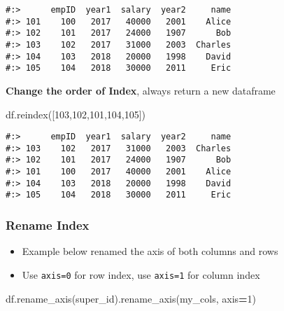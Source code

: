 \documentclass[
]{book}
\newenvironment{Shaded}{\begin{snugshade}}{\end{snugshade}}
\newcommand{\DecValTok}[1]{\textcolor[rgb]{0.06,0.06,0.06}{#1}}
\newcommand{\NormalTok}[1]{#1}
\newcommand{\OperatorTok}[1]{\textcolor[rgb]{0.43,0.43,0.43}{\textbf{#1}}}
\newcommand{\StringTok}[1]{\textcolor[rgb]{0.5,0.5,0.5}{#1}}
\providecommand{\tightlist}{%
  \setlength{\itemsep}{0pt}\setlength{\parskip}{0pt}}
\begin{document}
\begin{verbatim}
#:>      empID  year1  salary  year2     name
#:> 101    100   2017   40000   2001    Alice
#:> 102    101   2017   24000   1907      Bob
#:> 103    102   2017   31000   2003  Charles
#:> 104    103   2018   20000   1998    David
#:> 105    104   2018   30000   2011     Eric
\end{verbatim}

\textbf{Change the order of Index}, always return a new dataframe

\begin{Shaded}
\begin{Highlighting}[]
\NormalTok{df.reindex([}\DecValTok{103}\NormalTok{,}\DecValTok{102}\NormalTok{,}\DecValTok{101}\NormalTok{,}\DecValTok{104}\NormalTok{,}\DecValTok{105}\NormalTok{])}
\end{Highlighting}
\end{Shaded}

\begin{verbatim}
#:>      empID  year1  salary  year2     name
#:> 103    102   2017   31000   2003  Charles
#:> 102    101   2017   24000   1907      Bob
#:> 101    100   2017   40000   2001    Alice
#:> 104    103   2018   20000   1998    David
#:> 105    104   2018   30000   2011     Eric
\end{verbatim}

\hypertarget{rename-index}{%
\subsubsection{Rename Index}\label{rename-index}}

\begin{itemize}
\tightlist
\item
  Example below renamed the axis of both columns and rows\\
\item
  Use \texttt{axis=0} for row index, use \texttt{axis=1} for column index
\end{itemize}

\begin{Shaded}
\begin{Highlighting}[]
\NormalTok{df.rename\_axis(}\StringTok{\textquotesingle{}super\_id\textquotesingle{}}\NormalTok{).rename\_axis(}\StringTok{\textquotesingle{}my\_cols\textquotesingle{}}\NormalTok{, axis}\OperatorTok{=}\DecValTok{1}\NormalTok{)}
\end{Highlighting}
\end{Shaded}
\end{document}

